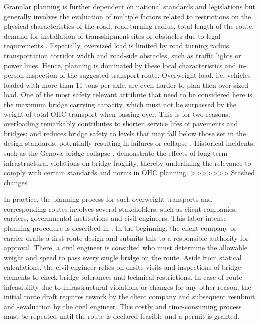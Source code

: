 Granular planning is further dependent on national standards and legislations but generally involves the evaluation of multiple factors related to restrictions on the physical characteristics of the road, road turning radius, total length of the route, demand for installation of transshipment sites or obstacles due to legal requirements \cite{PETRASKA.2018}.
Especially, oversized load is limited by road turning radius, transportation corridor width and road-side obstacles, such as traffic lights or power lines.
Hence, planning is dominated by these local characteristics and in-person inspection of the suggested transport route.
Overweight load, i.e. vehicles loaded with more than 11 tons per axle, are even harder to plan then over-sized load.
One of the most safety relevant attribute that need to be considered here is the maximum bridge carrying capacity, which must not be surpassed by the weight of total OHC transport when passing over.
This is for two reasons; overloading remarkably contributes to shorten service lifes of pavements and bridges; and reduces bridge safety to levels that may fall below those set in the design standards, potentially resulting in failures or collapse \cite{fiorillo2018fragility}.
Historical incidents, such as the Genova bridge collapse \cite{Morgese.2020, MorandiNYTimes},  demonstrate the effects of long-term infrastructural violations on bridge fragility, thereby underlining the relevance to comply with certain standards and norms in OHC planning.
>>>>>>> Stashed changes
\par In practice, the planning process for such overweight transports and corresponding routes involves several stakeholders, such as client companies, carriers, governmental institutions and civil engineers.
This labor intense planning procedure is described in \cite{Osegueda.1999}. In the beginning, the client company or carrier drafts a first route design and submits this to a responsible authority for approval.
There, a civil engineer is consulted who must determine the allowable weight and speed to pass every single bridge on the route. Aside from statical calculations, the civil engineer relies on onsite visits and inspections of bridge elements to check bridge tolerances and technical restrictions.
In case of route infeasibility due to infrastructural violations or changes for any other reason, the initial route draft requires rework by the client company and subsequent resubmit and -evaluation by the civil engineer.
This costly and time-consuming process must be repeated until the route is declared feasible and a permit is granted.

